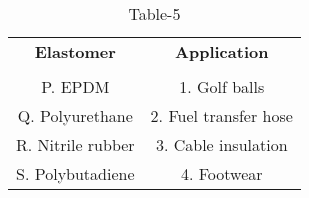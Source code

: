 \begin{table}[htbp]
  \centering
  \caption{Table-5}
  \label{tab:tables/table5.tex}
  \begin{tabular}{cc}
  \textbf{Elastomer} & \textbf{Application} \\ \\
    P. EPDM & 1. Golf balls \\
    Q. Polyurethane & 2. Fuel transfer hose \\
    R. Nitrile rubber & 3. Cable insulation \\
    S. Polybutadiene & 4. Footwear \\
  \end{tabular}
\end{table}